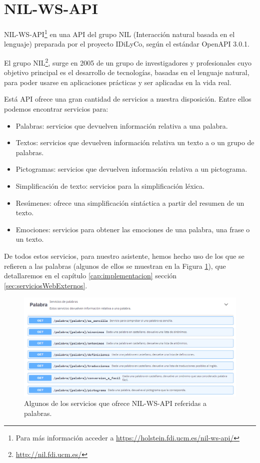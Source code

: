 \section{NIL-WS-API}\label{sec:nilws}

NIL-WS-API\footnote{Para más información acceder a \href{https://holstein.fdi.ucm.es/nil-ws-api/}{https://holstein.fdi.ucm.es/nil-ws-api/}} en una API del grupo NIL (Interacción natural basada en el lenguaje) preparada por el proyecto IDiLyCo, según el estándar OpenAPI 3.0.1. 

El grupo NIL\footnote{\href{http://nil.fdi.ucm.es/}{http://nil.fdi.ucm.es/}}, surge en 2005 de un grupo de investigadores y profesionales cuyo objetivo principal es el desarrollo de tecnologías, basadas en el lenguaje natural, para poder usarse en aplicaciones prácticas y ser aplicadas en la vida real. 

Está API ofrece una gran cantidad de servicios a nuestra disposición. Entre ellos podemos encontrar servicios para:


\begin{itemize}
	\item Palabras: servicios que devuelven información relativa a una palabra.
	\item Textos: servicios que devuelven información relativa  un texto a o un grupo de palabras.
	\item Pictogramas: servicios que devuelven información relativa a un pictograma.
	\item Simplificación de texto: servicios para la simplificación léxica.
	\item Resúmenes: ofrece una simplificación sintáctica a partir del resumen de un texto.
	\item Emociones: servicios para obtener las emociones de una palabra, una frase o un texto. 
\end{itemize}

De todos estos servicios, para nuestro asistente, hemos hecho uso de los que se refieren a las palabras (algunos de ellos se muestran en la Figura \ref{fig:apiNILWS}), que detallaremos en el capítulo \ref{cap:implementacion} sección \ref{sec:serviciosWebExternos}.

	\begin{figure}[h!]
	\centering
	
	
	\includegraphics[scale=0.7]{Imagenes/Figuras/apiNil}
	
	
	\caption{Algunos de los servicios que ofrece NIL-WS-API referidas a palabras.}
	\label{fig:apiNILWS}
\end{figure}

